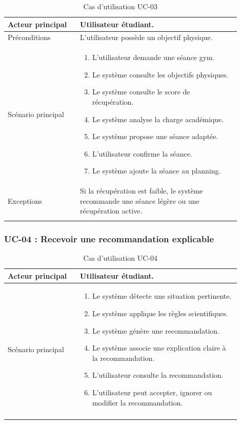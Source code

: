 \documentclass[12pt]{article}
\begin{document}
\begin{longtable}{|p{0.28\linewidth}|p{0.62\linewidth}|}
\hline
Acteur principal & Utilisateur étudiant. \\ \hline

Préconditions & L'utilisateur possède un objectif physique. \\ \hline

Scénario principal &
\begin{enumerate}[leftmargin=*]
    \item L'utilisateur demande une séance gym.
    \item Le système consulte les objectifs physiques.
    \item Le système consulte le score de récupération.
    \item Le système analyse la charge académique.
    \item Le système propose une séance adaptée.
    \item L'utilisateur confirme la séance.
    \item Le système ajoute la séance au planning.
\end{enumerate}
\\ \hline

Exceptions & Si la récupération est faible, le système recommande une séance légère ou une récupération active. \\ \hline

\caption{Cas d'utilisation UC-03}
\label{tab:uc-03}
\end{longtable}

\subsubsection{UC-04 : Recevoir une recommandation explicable}

\begin{longtable}{|p{0.28\linewidth}|p{0.62\linewidth}|}
\hline
Acteur principal & Utilisateur étudiant. \\ \hline

Scénario principal &
\begin{enumerate}[leftmargin=*]
    \item Le système détecte une situation pertinente.
    \item Le système applique les règles scientifiques.
    \item Le système génère une recommandation.
    \item Le système associe une explication claire à la recommandation.
    \item L'utilisateur consulte la recommandation.
    \item L'utilisateur peut accepter, ignorer ou modifier la recommandation.
\end{enumerate}
\\ \hline

\caption{Cas d'utilisation UC-04}
\label{tab:uc-04}
\end{longtable}
\end{document}
